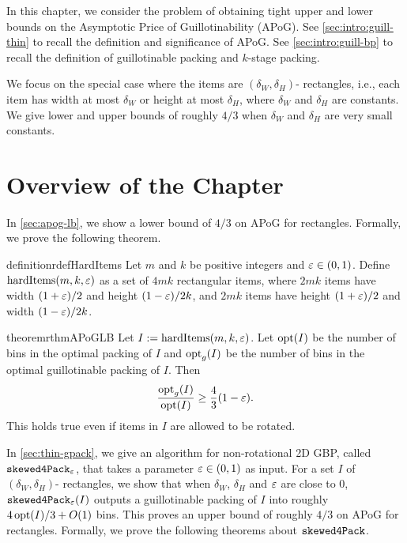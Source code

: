 In this chapter, we consider the problem of obtaining tight upper and lower bounds
on the Asymptotic Price of Guillotinability (APoG).
See \cref{sec:intro:guill-thin} to recall the definition and significance of APoG.
See \cref{sec:intro:guill-bp} to recall the definition of guillotinable packing
and $k$-stage packing.

We focus on the special case where the items are
$(\delta_W, \delta_H)$-\thin{} rectangles, i.e., each item has
width at most $\delta_W$ or height at most $\delta_H$,
where $\delta_W$ and $\delta_H$ are constants.
We give lower and upper bounds of roughly $4/3$ when
$\delta_W$ and $\delta_H$ are very small constants.

\section{Overview of the Chapter}

In \cref{sec:apog-lb}, we show a lower bound of $4/3$ on APoG
for \thin{} rectangles. Formally, we prove the following theorem.

\begin{restatable}{definition}{rdefHardItems}
Let $m$ and $k$ be positive integers and $\varepsilon \in (0, 1)$.
Define $\operatorname{hardItems}(m, k, \varepsilon)$ as a set of $4mk$ rectangular items,
where $2mk$ items have width $(1+\varepsilon)/2$ and height $(1-\varepsilon)/2k$,
and $2mk$ items have height $(1+\varepsilon)/2$ and width $(1-\varepsilon)/2k$.
\end{restatable}

\begin{restatable}{theorem}{rthmAPoGLB}
\label{thm:apog-lb}
Let $I := \operatorname{hardItems}(m, k, \varepsilon)$. Let $\operatorname{opt}(I)$ be the number of bins in the
optimal packing of $I$ and $\operatorname{opt}_g(I)$ be the number of bins in the
optimal guillotinable packing of $I$. Then
\[ \frac{\operatorname{opt}_g(I)}{\operatorname{opt}(I)} \ge \frac{4}{3} (1-\varepsilon). \]
This holds true even if items in $I$ are allowed to be rotated.
\end{restatable}

In \cref{sec:thin-gpack}, we give an algorithm for non-rotational 2D GBP,
called $\operatorname{\mathtt{skewed4Pack}}_{\varepsilon}$, that takes a parameter $\varepsilon \in (0, 1)$ as input.
For a set $I$ of $(\delta_W, \delta_H)$-\thin{} rectangles, we show that when
$\delta_W$, $\delta_H$ and $\varepsilon$ are close to 0, $\operatorname{\mathtt{skewed4Pack}}_{\varepsilon}(I)$ outputs a
guillotinable packing of $I$ into roughly $4\operatorname{opt}(I)/3 + O(1)$ bins.
This proves an upper bound of roughly $4/3$ on APoG for \thin{} rectangles.
Formally, we prove the following theorems about $\operatorname{\mathtt{skewed4Pack}}$.


